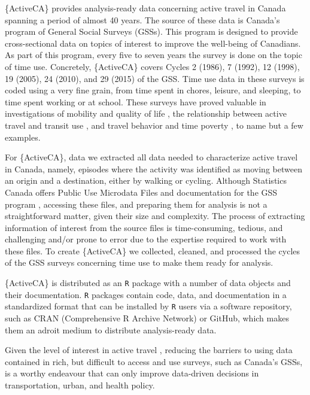 \documentclass[Royal,times,sageh]{sagej}
\begin{document}
\{ActiveCA\} provides analysis-ready data concerning active travel in
Canada spanning a period of almost 40 years. The source of these data is
Canada's program of General Social Surveys (GSSs). This program is
designed to provide cross-sectional data on topics of interest to
improve the well-being of Canadians. As part of this program, every five
to seven years the survey is done on the topic of time use. Concretely,
\{ActiveCA\} covers Cycles 2 (1986), 7 (1992), 12 (1998), 19 (2005), 24
(2010), and 29 (2015) of the GSS. Time use data in these surveys is
coded using a very fine grain, from time spent in chores, leisure, and
sleeping, to time spent working or at school. These surveys have proved
valuable in investigations of mobility and quality of life
\citep{spinneyTransport2009}, the relationship between active travel and
transit use \citep{lachapelleLonger2016}, and travel behavior and time
poverty \citep{kimFacing2024}, to name but a few examples.

For \{ActiveCA\}, data we extracted all data needed to characterize
active travel in Canada, namely, episodes where the activity was
identified as moving between an origin and a destination, either by
walking or cycling. Although Statistics Canada offers Public Use
Microdata Files and documentation for the GSS program
\citep[see][]{statisticscanada2024}, accessing these files, and
preparing them for analysis is not a straightforward matter, given their
size and complexity. The process of extracting information of interest
from the source files is time-consuming, tedious, and challenging and/or
prone to error due to the expertise required to work with these files.
To create \{ActiveCA\} we collected, cleaned, and processed the cycles
of the GSS surveys concerning time use to make them ready for analysis.

\{ActiveCA\} is distributed as an \texttt{R} package with a number of
data objects and their documentation. \texttt{R} packages contain code,
data, and documentation in a standardized format that can be installed
by \texttt{R} users via a software repository, such as CRAN
(Comprehensive R Archive Network) or GitHub, which makes them an adroit
medium to distribute analysis-ready data.

Given the level of interest in active travel
\citep[e.g.,][]{mccurdySupport2023}, reducing the barriers to using data
contained in rich, but difficult to access and use surveys, such as
Canada's GSSs, is a worthy endeavour that can only improve data-driven
decisions in transportation, urban, and health policy.
\end{document}
